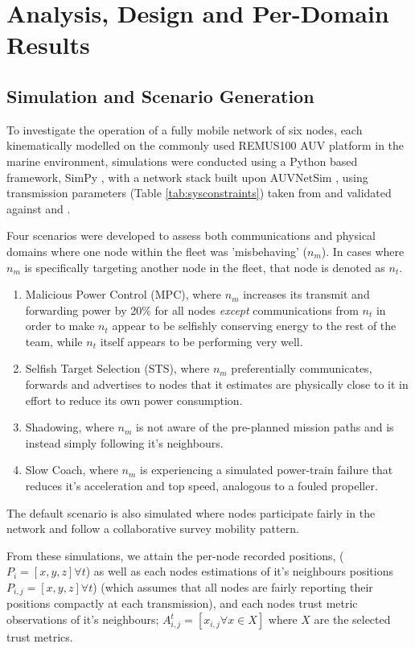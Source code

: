 \documentclass{aamas2016}
\begin{document}
\section{Analysis, Design and Per-Domain Results}

\subsection{Simulation and Scenario Generation}
To investigate the operation of a fully mobile network of six nodes, each kinematically modelled on the commonly used REMUS100 AUV platform \cite{Milgram2001} in the marine environment, simulations were conducted using a Python based framework, SimPy \cite{Mueller2003SimPy}, with a network stack built upon AUVNetSim \cite{Miquel2008}, using transmission parameters (Table \ref{tab:sysconstraints}) taken from and validated against \cite{Stojanovic2007} and \cite{Stefanov2011}.

Four scenarios were developed to assess both communications and physical domains where one node within the fleet was 'misbehaving' ($n_m$). In cases where $n_m$ is specifically targeting another node in the fleet, that node is denoted as $n_t$.

\begin{enumerate}
	\item Malicious Power Control (MPC), where $n_m$ increases its transmit and forwarding power by 20\% for all nodes \emph{except} communications from $n_t$ in order to make $n_t$ appear to be selfishly conserving energy to the rest of the team, while $n_t$ itself appears to be performing very well.
	\item Selfish Target Selection (STS), where $n_m$ preferentially communicates, forwards and advertises to nodes that it estimates are physically close to it in effort to reduce its own power consumption.
	\item Shadowing, where $n_m$ is not aware of the pre-planned mission paths and is instead simply following it's neighbours.
	\item Slow Coach, where $n_m$ is experiencing a simulated power-train failure that reduces it's acceleration and top speed, analogous to a fouled propeller. 
\end{enumerate}

The default scenario is also simulated where nodes participate fairly in the network and follow a collaborative survey mobility pattern.

From these simulations, we attain the per-node recorded positions, ($P_i = [x,y,z] \forall t$) as well as each nodes estimations of it's neighbours positions $P_{i,j} = [x,y,z] \forall t$) (which assumes that all nodes are fairly reporting their positions compactly at each transmission), and each nodes trust metric observations of it's neighbours; $A_{i,j}^t = [ x_{i,j} \forall x \in X ] $ where $X$ are the selected trust metrics.
\end{document}
